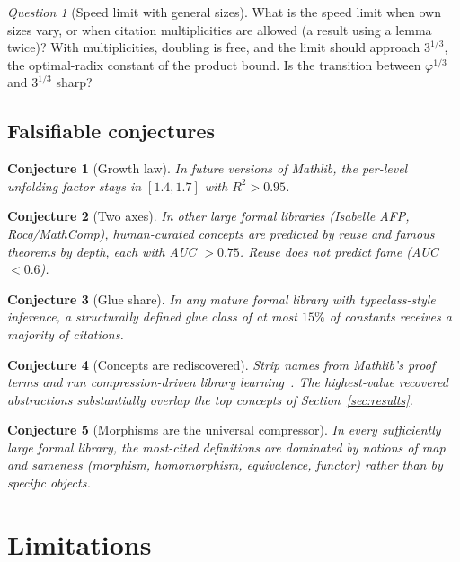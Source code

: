 \documentclass[11pt]{article}
\newtheorem{conjecture}{Conjecture}
\theoremstyle{remark}
\newtheorem{question}{Question}
\begin{document}
\begin{question}[Speed limit with general sizes]
What is the speed limit when own sizes vary, or when citation multiplicities are allowed
(a result using a lemma twice)? With multiplicities, doubling is free, and the limit
should approach $3^{1/3}$, the optimal-radix constant of the product bound. Is the
transition between $\varphi^{1/3}$ and $3^{1/3}$ sharp?
\end{question}

\subsection{Falsifiable conjectures}

\begin{conjecture}[Growth law]
In future versions of Mathlib, the per-level unfolding factor stays in $[1.4,1.7]$ with
$R^2>0.95$.
\end{conjecture}

\begin{conjecture}[Two axes]
In other large formal libraries (Isabelle AFP, Rocq/MathComp), human-curated concepts are
predicted by reuse and famous theorems by depth, each with AUC $>0.75$. Reuse does not
predict fame (AUC $<0.6$).
\end{conjecture}

\begin{conjecture}[Glue share]
In any mature formal library with typeclass-style inference, a structurally defined glue
class of at most $15\%$ of constants receives a majority of citations.
\end{conjecture}

\begin{conjecture}[Concepts are rediscovered]
Strip names from Mathlib's proof terms and run compression-driven library
learning~\cite{dreamcoder,stitch}. The highest-value recovered abstractions substantially
overlap the top concepts of Section~\ref{sec:results}.
\end{conjecture}

\begin{conjecture}[Morphisms are the universal compressor]
In every sufficiently large formal library, the most-cited definitions are dominated by
notions of map and sameness (morphism, homomorphism, equivalence, functor) rather than by
specific objects.
\end{conjecture}

\section{Limitations}
\end{document}
